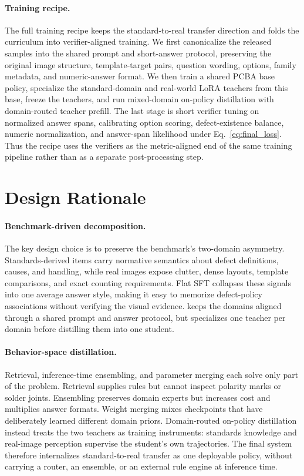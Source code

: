 \documentclass[sigconf, screen, review, anonymous]{acmart}
\begin{document}
\paragraph{Training recipe.}
The full training recipe keeps the standard-to-real transfer direction and folds the curriculum into verifier-aligned training. We first canonicalize the released samples into the shared prompt and short-answer protocol, preserving the original image structure, template-target pairs, question wording, options, family metadata, and numeric-answer format. We then train a shared PCBA base policy, specialize the standard-domain and real-world LoRA teachers from this base, freeze the teachers, and run mixed-domain on-policy distillation with domain-routed teacher prefill. The last stage is short verifier tuning on normalized answer spans, calibrating option scoring, defect-existence balance, numeric normalization, and answer-span likelihood under Eq.~\ref{eq:final_loss}. Thus the recipe uses the verifiers as the metric-aligned end of the same training pipeline rather than as a separate post-processing step.

\vspace{-0.3em}

\section{Design Rationale}
\label{sec:rationale}

\paragraph{Benchmark-driven decomposition.}
The key design choice is to preserve the benchmark's two-domain asymmetry. Standards-derived items carry normative semantics about defect definitions, causes, and handling, while real images expose clutter, dense layouts, template comparisons, and exact counting requirements. Flat SFT collapses these signals into one average answer style, making it easy to memorize defect-policy associations without verifying the visual evidence. \method{} keeps the domains aligned through a shared prompt and answer protocol, but specializes one teacher per domain before distilling them into one student.

\paragraph{Behavior-space distillation.}
Retrieval, inference-time ensembling, and parameter merging each solve only part of the problem. Retrieval supplies rules but cannot inspect polarity marks or solder joints. Ensembling preserves domain experts but increases cost and multiplies answer formats. Weight merging mixes checkpoints that have deliberately learned different domain priors. Domain-routed on-policy distillation instead treats the two teachers as training instruments: standards knowledge and real-image perception supervise the student's own trajectories. The final system therefore internalizes standard-to-real transfer as one deployable policy, without carrying a router, an ensemble, or an external rule engine at inference time.
\end{document}
